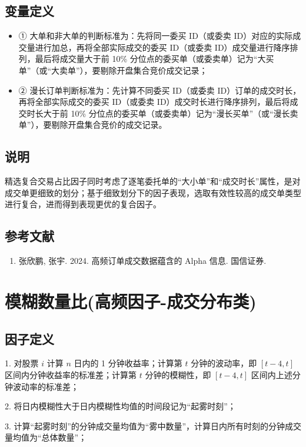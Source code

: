 \documentclass{article}
\begin{document}
\subsection{变量定义}
\begin{itemize}
    \item ① 大单和非大单的判断标准为：先将同一委买 ID（或委卖 ID）对应的实际成交量进行加总，再将全部实际成交的委买 ID（或委卖 ID）成交量进行降序排列，最后将成交量大于前 10\% 分位点的委买单（或委卖单）记为“大买单”（或“大卖单”），要剔除开盘集合竞价成交记录；
    \item ② 漫长订单判断标准为：先计算不同委买 ID（或委卖 ID）订单的成交时长，再将全部实际成交的委买 ID（或委卖 ID）成交时长进行降序排列，最后将成交时长大于前 10\% 分位点的委买单（或委卖单）记为“漫长买单”（或“漫长卖单”），要剔除开盘集合竞价的成交记录。
\end{itemize}

\subsection{说明}
精选复合交易占比因子同时考虑了逐笔委托单的“大小单”和“成交时长”属性，是对成交单更细致的划分；基于细致划分下的因子表现，选取有效性较高的成交单类型进行复合，进而得到表现更优的复合因子。

\subsection{参考文献}
\begin{enumerate}
    \item 张欣鹏, 张宇. 2024. 高频订单成交数据蕴含的 Alpha 信息. 国信证券.
\end{enumerate}

\section{模糊数量比(高频因子-成交分布类)}

\subsection{因子定义}

1. 对股票 \( i \) 计算 \( n \) 日内的 1 分钟收益率；计算第 \( t \) 分钟的波动率，即 \([t-4, t]\) 区间内分钟收益率的标准差；计算第 \( t \) 分钟的模糊性，即 \([t-4, t]\) 区间内上述分钟波动率的标准差；

2. 将日内模糊性大于日内模糊性均值的时间段记为“起雾时刻”；

3. 计算“起雾时刻”的分钟成交量均值为“雾中数量”，计算日内所有时刻的分钟成交量均值为“总体数量”；
\end{document}
